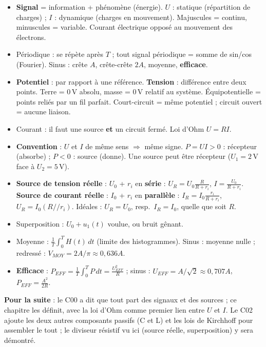 \begin{recapbox}[title={Récap pour l'examen --- C01 : Signaux et sources}]
\begin{itemize}
  \item \textbf{Signal} = information + phénomène (énergie). $U$ : statique (répartition de
        charges) ; $I$ : dynamique (charges en mouvement). Majuscules = continu, minuscules
        = variable. Courant électrique opposé au mouvement des électrons.
  \item Périodique : se répète après $T$ ; tout signal périodique = somme de sin/cos
        (Fourier). Sinus : crête $A$, crête-crête $2A$, moyenne, \textbf{efficace}.
  \item \textbf{Potentiel} : par rapport à une référence. \textbf{Tension} : différence entre
        deux points. Terre = 0\,V absolu, masse = 0\,V relatif au système. Équipotentielle
        = points reliés par un fil parfait. Court-circuit = même potentiel ; circuit ouvert
        = aucune liaison.
  \item Courant : il faut une source \textbf{et} un circuit fermé. Loi d'Ohm $U = RI$.
  \item \textbf{Convention} : $U$ et $I$ de même sens $\Rightarrow$ même signe. $P = UI > 0$ :
        récepteur (absorbe) ; $P<0$ : source (donne). Une source peut être récepteur
        ($U_1 = 2$\,V face à $U_2 = 5$\,V).
  \item \textbf{Source de tension réelle} : $U_0$ + $r_i$ en \textbf{série} :
        $U_R = U_0\frac{R}{R+r_i}$, $I = \frac{U_0}{R+r_i}$. \textbf{Source de courant
        réelle} : $I_0$ + $r_i$ en \textbf{parallèle} : $I_R = I_0\frac{r_i}{R+r_i}$,
        $U_R = I_0 (R/\!/r_i)$. Idéales : $U_R = U_0$, resp.\ $I_R = I_0$, quelle que soit $R$.
  \item Superposition : $U_0 + u_1(t)$ voulue, ou bruit gênant.
  \item Moyenne : $\frac{1}{T}\int_0^T H(t)\,dt$ (limite des histogrammes). Sinus : moyenne
        nulle ; redressé : $V_{MOY} = 2A/\pi \approx 0{,}636A$.
  \item \textbf{Efficace} : $P_{EFF} = \frac{1}{T}\int_0^T P\,dt = \frac{U_{EFF}^2}{R}$ ;
        sinus : $U_{EFF} = A/\sqrt2 \approx 0{,}707A$, $P_{EFF} = \frac{A^2}{2R}$.
\end{itemize}
\textbf{Pour la suite} : le C00 a dit que tout part des signaux et des sources ; ce
chapitre les définit, avec la loi d'Ohm comme premier lien entre $U$ et $I$. Le C02 ajoute
les deux autres composants passifs (C et L) et les lois de Kirchhoff pour assembler le tout ;
le diviseur résistif vu ici (source réelle, superposition) y sera démontré.
\end{recapbox}
